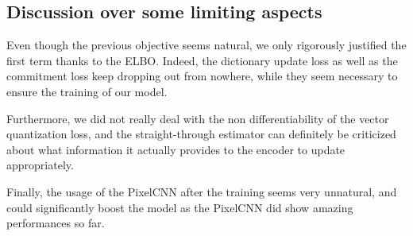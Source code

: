 \subsection{Discussion over some limiting aspects}

Even though the previous objective seems natural, we only rigorously justified the first term thanks to the ELBO.
Indeed, the dictionary update loss as well as the commitment loss keep dropping out from nowhere, while they seem necessary to ensure the training of our model.
\medskip

Furthermore, we did not really deal with the non differentiability of the vector quantization loss, and the straight-through estimator
can definitely be criticized about what information it actually provides to the encoder to update appropriately.
\medskip

Finally, the usage of the PixelCNN after the training seems very unnatural, and could significantly boost the model as the PixelCNN did show amazing performances so far.